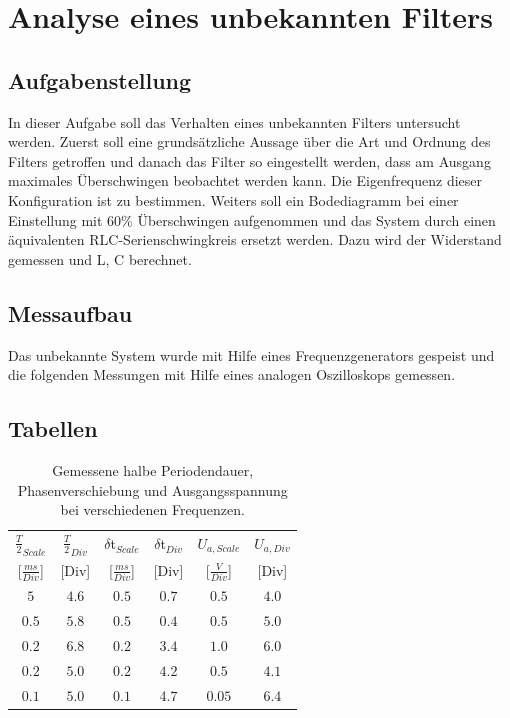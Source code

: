 \documentclass[12pt,a4paper,ngerman]{article}
\begin{document}


%
%

\section{Analyse eines unbekannten Filters}
\subsection{Aufgabenstellung}
In dieser Aufgabe soll das Verhalten eines unbekannten Filters untersucht werden. Zuerst soll eine grundsätzliche Aussage über die Art und Ordnung des Filters getroffen und danach das Filter so eingestellt werden, dass am Ausgang maximales Überschwingen beobachtet werden kann. 
Die Eigenfrequenz dieser Konfiguration ist zu bestimmen. Weiters soll ein Bodediagramm bei einer Einstellung mit 60\% Überschwingen aufgenommen und das System durch einen äquivalenten RLC-Serienschwingkreis ersetzt werden. Dazu wird der Widerstand gemessen und L, C berechnet.

\subsection{Messaufbau}

Das unbekannte System wurde mit Hilfe eines Frequenzgenerators gespeist und die folgenden Messungen mit Hilfe eines analogen Oszilloskops gemessen. 

\subsection{Tabellen}
\begin{table}[H]
\begin{center}
\begin{tabular}{ |c|c||c|c||c|c| }
  \hline
    $\frac{T}{2}_{Scale}$ & $\frac{T}{2}_{Div}$ & $\delta$t$_{Scale}$ & $\delta$t$_{Div}$ & $U_{a,Scale}$ & $U_{a,Div}$\\

    [$\frac{ms}{Div}$] & [Div] & [$\frac{ms}{Div}$] & [Div] & [$\frac{V}{Div}$] & [Div]\\
  \hline
$5$ & $4.6$ & $0.5$ & $0.7$ & $0.5$ & $4.0$ \\
  \hline
$0.5$ & $5.8$ & $0.5$ & $0.4$ & $0.5$ & $5.0$ \\
  \hline
$0.2$ & $6.8$ & $0.2$ & $3.4$ & $1.0$ & $6.0$ \\
  \hline
$0.2$ & $5.0$ & $0.2$ & $4.2$ & $0.5$ & $4.1$ \\
  \hline
$0.1$ & $5.0$ & $0.1$ & $4.7$ & $0.05$ & $6.4$ \\
  \hline
\end{tabular}
\caption{Gemessene halbe Periodendauer, Phasenverschiebung und Ausgangsspannung bei verschiedenen Frequenzen.}
\end{center}
\label{tab:1}
\end{table}
\end{document}
